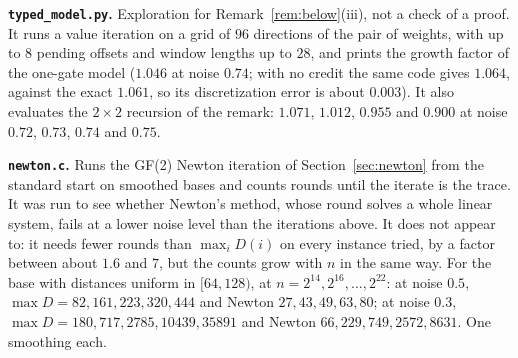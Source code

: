 \documentclass[11pt]{amsart}
\theoremstyle{definition}
\theoremstyle{remark}
\begin{document}
\medskip\noindent\textbf{\texttt{typed\_model.py}.} Exploration for
Remark~\ref{rem:below}(iii), not a check of a proof. It runs a value iteration on a grid of $96$
directions of the pair of weights, with up to $8$ pending offsets and window lengths up to $28$,
and prints the growth factor of the one-gate model ($1.046$ at noise $0.74$; with no credit the
same code gives $1.064$, against the exact $1.061$, so its discretization error is about
$0.003$). It also evaluates the $2\times2$ recursion of the remark: $1.071$, $1.012$, $0.955$
and $0.900$ at noise $0.72$, $0.73$, $0.74$ and $0.75$.

\medskip\noindent\textbf{\texttt{newton.c}.} Runs the GF(2) Newton iteration of Section~\ref{sec:newton} from the
standard start on smoothed bases and counts rounds until the iterate is the trace. It was run to
see whether Newton's method, whose round solves a whole linear system, fails at a lower noise
level than the iterations above. It does not appear to: it needs fewer rounds than $\max_iD(i)$
on every instance tried, by a factor between about $1.6$ and $7$, but the counts grow with $n$ in
the same way. For the base with distances uniform in $[64,128)$, at $n=2^{14},2^{16},\dots,2^{22}$:
at noise $0.5$, $\max D=82,161,223,320,444$ and Newton $27,43,49,63,80$; at noise $0.3$,
$\max D=180,717,2785,10439,35891$ and Newton $66,229,749,2572,8631$. One smoothing each.
\end{document}
